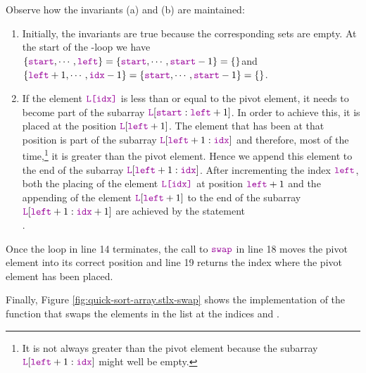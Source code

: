 \begin{enumerate}
      Observe how the invariants (a) and (b) are maintained:
      \begin{enumerate}
      \item Initially, the invariants are true because the corresponding sets are empty.
            At the start of the -loop we have
            \\[0.2cm]
            \hspace*{1.3cm}
            $\{ \mytt{start}, \cdots, \mytt{left} \} = \{ \mytt{start}, \cdots, \mytt{start} - 1\} = \{\}$\quad and
            \\[0.2cm]
            \hspace*{1.3cm}
            $\{ \mytt{left}+1,\cdots,\mytt{idx}-1\} =  \{ \mytt{start},\cdots,\mytt{start}-1\}=\{\}$.
      \item If the element $\mytt{L[idx]}$ is less than or equal to the
            pivot element, it needs to become part of the subarray $\mytt{L}[\mytt{start}:\mytt{left}+1]$.  In order to
            achieve this, it is placed at the position $\mytt{L}[\mytt{left}+1]$.  The element that has been at
            that position is part of the subarray $\mytt{L}[\mytt{left}+1:\mytt{idx}]$ and therefore,
            most of the time,\footnote{
              It is not always greater than the pivot element
              because the subarray $\mytt{L}[\mytt{left}+1:\mytt{idx}]$ might well be empty.}
            it is greater than the pivot element.  
            Hence we append this element to the end of the subarray
            $\mytt{L}[\mytt{left}+1:\mytt{idx}]$.  After incrementing the index $\mytt{left}$,
            both the placing of the element $\mytt{L[idx]}$ at position $\mytt{left}+1$ and the appending
            of the element $\mytt{L}[\mytt{left}+1]$ to the end of the subarray
            $\mytt{L}[\mytt{left}+1:\mytt{idx}+1]$ are achieved by the statement
            \\[0.2cm]
            \hspace*{1.3cm}
            .            
      \end{enumerate}
      Once the  loop in line 14 terminates, the call to $\mytt{swap}$ in line 18 moves
      the pivot element into its correct position and line 19 returns the index where the pivot element has been
      placed. 
\end{enumerate}

\noindent
Finally, Figure \ref{fig:quick-sort-array.stlx-swap} shows the
implementation of the function  that swaps the elements in the list  at the indices 
and . 

